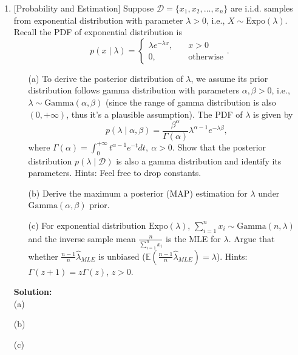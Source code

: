 \documentclass[10pt]{article}
\begin{document}
\begin{enumerate}[1.]
	\item {} [Probability and Estimation]
	Suppose $\mathcal{D}=\{ x_{1}, x_{2}, \ldots, x_{n} \}$ are i.i.d. samples from exponential distribution with parameter 
	$\lambda > 0$, i.e., $X \sim \text{Expo}(\lambda)$. Recall the PDF of exponential distribution is
	\[
		p(x\mid \lambda) = \begin{cases}
		\lambda e^{-\lambda x},&\quad x > 0 \\
		0,&\quad \text{otherwise}
		\end{cases}.
	\]
	      \begin{itemize}
			\item[(a)] To derive the posterior distribution of $\lambda$, we assume its prior 
			distribution follows gamma distribution with parameters $\alpha,\beta > 0$, i.e., 
			$\lambda \sim\text{Gamma}(\alpha,\beta)$ (since the range of gamma distribution 
			is also $(0,+\infty)$, thus it's a plausible assumption). The PDF of $\lambda$ is 
			given by
			\[
				p(\lambda\mid \alpha,\beta) = \frac{\beta^{\alpha}}{\Gamma(\alpha)} \lambda^{\alpha-1}e^{-\lambda\beta},
			\]
			where $\Gamma(\alpha) = \int_{0}^{+\infty} t^{\alpha-1}e^{-t}dt,\ \alpha>0$. 
			Show that the posterior distribution $p(\lambda\mid \mathcal{D})$ is also a 
			gamma distribution and identify its parameters. Hints: Feel free to drop 
			constants. 

			\item[(b)] Derive the maximum a posterior (MAP) estimation for $\lambda$ 
			under $\text{Gamma}(\alpha,\beta)$ prior. 
			
			\item[(c)] For exponential distribution $\text{Expo}(\lambda)$, $\sum_{i=1}^{n} x_{i}\sim \text{Gamma}(n,\lambda)$ 
			and the inverse sample mean $\frac{n}{\sum_{i=1}^{n} x_{i}}$ is the MLE for $\lambda$. 
			Argue that whether $\frac{n-1}{n}\hat{\lambda}_{MLE}$ is unbiased ($\mathbb{E}(\frac{n-1}{n}\hat{\lambda}_{MLE})=\lambda$). 
			Hints: $\Gamma(z+1)=z\Gamma(z)$, $z > 0$. 
	      \end{itemize}

      	  \textbf{Solution:}\\
		  (a)






		  (b)




		  (c)



      	  
      	  \newpage


\end{enumerate}
\end{document}
